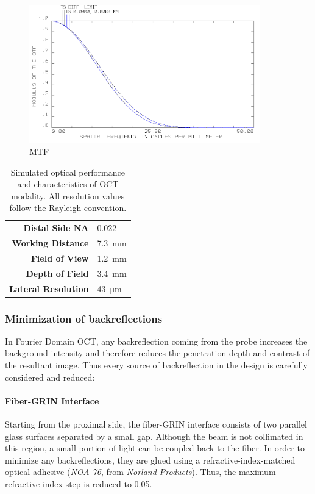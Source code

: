 \begin{figure}[h!]\centering
      \includegraphics[width=10cm]{figures/30_DesignSimulation/Optical/beamsplitterMTF.png}
      \caption{MTF}
      \label{fig:BSMTF}
\end{figure}

\begin{table}\centering
	\begin{tabular}{rl}\\
		\hline
		\textbf{Distal Side NA} & 0.022 \\ 
		\textbf{Working Distance} & \SI{7.3}{\milli\meter} \\ 
		\textbf{Field of View} & \SI{1.2}{\milli\meter} \\ 
		\textbf{Depth of Field} & \SI{3.4}{\milli\meter} \\ 
		\textbf{Lateral Resolution} & \SI{43}{\micro\meter} \\ 
		\hline
	\end{tabular} 
    \caption{Simulated optical performance and characteristics of OCT modality. All resolution values follow the Rayleigh convention.}
    \label{tab:simRes}
\end{table}


\subsubsection{Minimization of backreflections}
In Fourier Domain OCT, any backreflection coming from the probe increases the background intensity and therefore reduces the penetration depth and contrast of the resultant image. Thus every source of backreflection in the design is carefully considered and reduced:

\paragraph{Fiber-GRIN Interface}
Starting from the proximal side, the fiber-GRIN interface consists of two parallel glass surfaces separated by a small gap. Although the beam is not collimated in this region, a small portion of light can be coupled back to the fiber. In order to minimize any backreflections, they are glued using a refractive-index-matched optical adhesive (\textit{NOA 76}, from \textit{Norland Products}). Thus, the maximum refractive index step is reduced to \SI{0.05}{}.

